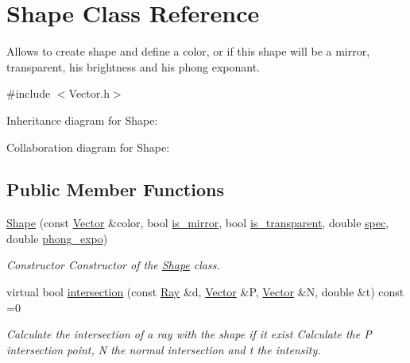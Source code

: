 \hypertarget{classShape}{}\section{Shape Class Reference}
\label{classShape}


Allows to create shape and define a color, or if this shape will be a mirror, transparent, his brightness and his phong exponant.  




{\ttfamily \#include $<$Vector.\+h$>$}



Inheritance diagram for Shape\+:


Collaboration diagram for Shape\+:
\subsection*{Public Member Functions}
\begin{DoxyCompactItemize}
\item 
\hyperlink{classShape_ac15c3dd4d56ded4efccf75f820cce913}{Shape} (const \hyperlink{classVector}{Vector} \&color, bool \hyperlink{classShape_a0ead7657fa5e4c7862fe1cedd670a9e5}{is\+\_\+mirror}, bool \hyperlink{classShape_ab8da3fc4606e66dea941ec23d25f53ef}{is\+\_\+transparent}, double \hyperlink{classShape_a60ef96ac5dea3478fdd1ab320e4c3bef}{spec}, double \hyperlink{classShape_a2556fca106f9503e6dfb4da703c28f7f}{phong\+\_\+expo})
\begin{DoxyCompactList}\small\item\em Constructor Constructor of the \hyperlink{classShape}{Shape} class. \end{DoxyCompactList}\item 
virtual bool \hyperlink{classShape_a5e193b10da347bdc1f7e9acf6e6779ba}{intersection} (const \hyperlink{classRay}{Ray} \&d, \hyperlink{classVector}{Vector} \&P, \hyperlink{classVector}{Vector} \&N, double \&t) const =0
\begin{DoxyCompactList}\small\item\em Calculate the intersection of a ray with the shape if it exist Calculate the P intersection point, N the normal intersection and t the intensity. \end{DoxyCompactList}\end{DoxyCompactItemize}
